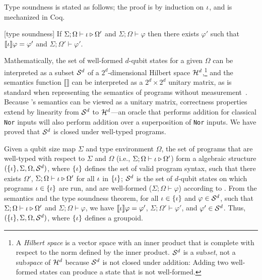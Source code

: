 \noindent
Type soundness is stated as follows; the proof is by induction on $\iota$, and is mechanized in Coq.

\begin{theorem}\label{thm:type-sound-oqasm}\rm[\oqasm type soundness]
If $\Sigma; \Omega \vdash \iota \triangleright \Omega'$ and $\Sigma;\Omega \vdash \varphi$ then there exists $\varphi'$ such that $\llbracket \iota \rrbracket\varphi=\varphi'$ and $\Sigma;\Omega' \vdash \varphi'$.
\end{theorem}

Mathematically, the set of well-formed $d$-qubit \oqasm states for a given $\Omega$ can be interpreted as a subset $\mathcal{S}^d$ of a $2^d$-dimensional Hilbert space $\mathcal{H}^d$,\footnote{A \emph{Hilbert space} is a vector space with an inner product that is complete with respect to the norm defined by the inner product. $\mathcal{S}^d$ is a sub\emph{set}, not a sub\emph{space} of $\mathcal{H}^d$ because $\mathcal{S}^d$ is not closed under addition: Adding two well-formed states can produce a state that is not well-formed.}
and the semantics function $\llbracket \rrbracket$ can be interpreted as a $2^d \times 2^d$ unitary matrix, as is standard when representing the semantics of programs without measurement~\cite{PQPC}.
Because \oqasm's semantics can be viewed as a unitary matrix, correctness properties extend by linearity from $\mathcal{S}^d$ to $\mathcal{H}^d$---an oracle that performs addition for classical \texttt{Nor} inputs will also perform addition over a superposition of \texttt{Nor} inputs. We have proved that $\mathcal{S}^d$ is closed under well-typed \oqasm programs.

Given a qubit size map $\Sigma$ and type environment $\Omega$, the set of \oqasm programs that are well-typed with respect to $\Sigma$ and $\Omega$ (i.e., $\Sigma;\Omega \vdash \iota \triangleright \Omega'$) form a algebraic structure $(\{\iota\},\Sigma, \Omega,\mathcal{S}^d)$, where $\{\iota\}$ defines the set of valid program syntax, such that there exists $\Omega'$, $\Sigma;\Omega \vdash \iota \triangleright \Omega'$ for all $\iota$ in $\{\iota\}$; $\mathcal{S}^d$ is the set of $d$-qubit states on which programs $\iota\in \{\iota\}$ are run, and are well-formed ($\Sigma;\Omega \vdash \varphi$) according to .
From the \oqasm semantics and the type soundness theorem, for all $\iota \in \{\iota\}$ and $\varphi \in \mathcal{S}^d$, such that $\Sigma;\Omega \vdash \iota \triangleright \Omega'$ and $\Sigma;\Omega \vdash \varphi$, we have $\llbracket \iota \rrbracket\varphi=\varphi'$, $\Sigma;\Omega' \vdash \varphi'$, and $\varphi' \in \mathcal{S}^d$. Thus, $(\{\iota\},\Sigma, \Omega,\mathcal{S}^d)$, where $\{\iota\}$ defines a groupoid.

